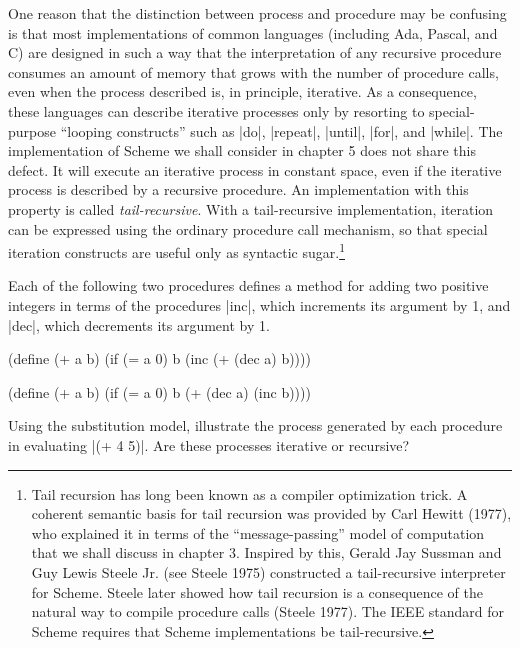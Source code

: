 One reason that the distinction between process and procedure may be
confusing is that most implementations of common languages (including
Ada, Pascal, and C) are designed in such a way that the interpretation
of any recursive procedure consumes an amount of memory that grows
with the number of procedure calls, even when the process described
is, in principle, iterative.  As a consequence, these languages can
describe iterative processes only by resorting to special-purpose
``looping constructs'' such as \scheme|do|, \scheme|repeat|,
\scheme|until|, \scheme|for|, and \scheme|while|.  The implementation
of Scheme we shall consider in chapter 5 does not share this defect.
It will execute an iterative process in constant space, even if the
iterative process is described by a recursive procedure.  An
implementation with this property is called \textit{tail-recursive}.
With a tail-recursive implementation, iteration can be expressed using
the ordinary procedure call mechanism, so that special iteration
constructs are useful only as syntactic sugar.\footnote{Tail recursion
  has long been known as a compiler optimization trick.  A coherent
  semantic basis for tail recursion was provided by Carl Hewitt
  (1977), who explained it in terms of the ``message-passing'' model
  of computation that we shall discuss in chapter 3. Inspired by this,
  Gerald Jay Sussman and Guy Lewis Steele Jr. (see Steele 1975)
  constructed a tail-recursive interpreter for Scheme.  Steele later
  showed how tail recursion is a consequence of the natural way to
  compile procedure calls (Steele 1977).  The IEEE standard for Scheme
  requires that Scheme implementations be tail-recursive.}

\begin{Exercise}
\label{exc:1.9}
Each of the following two procedures defines a method for adding two
positive integers in terms of the procedures \scheme|inc|,
which increments its argument by 1, and \scheme|dec|, which decrements
its argument by 1.

\begin{schemedisplay}
(define (+ a b)
  (if (= a 0)
      b
      (inc (+ (dec a) b))))

(define (+ a b)
  (if (= a 0)
      b
      (+ (dec a) (inc b))))
\end{schemedisplay}

Using the substitution model, illustrate the process generated by each
procedure in evaluating \scheme|(+ 4 5)|.  Are these processes
iterative or recursive?
\end{Exercise}

